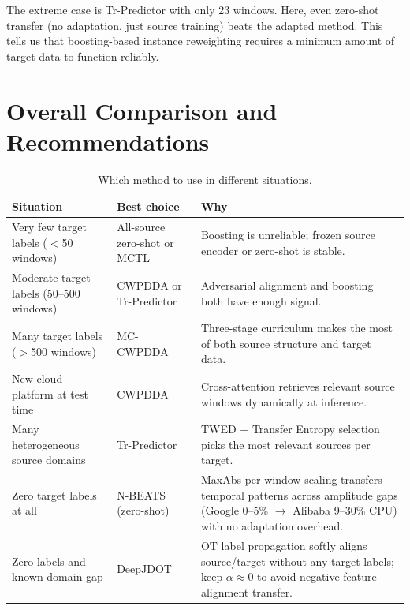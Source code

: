 \documentclass[12pt,a4paper]{article}
\begin{document}
The extreme case is Tr-Predictor with only 23 windows. Here, even zero-shot
transfer (no adaptation, just source training) beats the adapted method.
This tells us that boosting-based instance reweighting requires a minimum
amount of target data to function reliably.

\section{Overall Comparison and Recommendations}
\label{sec:discussion}

\begin{table}[H]
\centering
\small
\caption{Which method to use in different situations.}
\begin{tabular}{@{}p{4.2cm}p{3cm}p{6cm}@{}}
\toprule
\textbf{Situation} & \textbf{Best choice} & \textbf{Why} \\
\midrule
Very few target labels ($<$50 windows) &
  All-source zero-shot or MCTL &
  Boosting is unreliable; frozen source encoder or zero-shot is stable. \\
\addlinespace
Moderate target labels (50--500 windows) &
  CWPDDA or Tr-Predictor &
  Adversarial alignment and boosting both have enough signal. \\
\addlinespace
Many target labels ($>$500 windows) &
  MC-CWPDDA &
  Three-stage curriculum makes the most of both source structure and target data. \\
\addlinespace
New cloud platform at test time &
  CWPDDA &
  Cross-attention retrieves relevant source windows dynamically at inference. \\
\addlinespace
Many heterogeneous source domains &
  Tr-Predictor &
  TWED + Transfer Entropy selection picks the most relevant sources per target. \\
\addlinespace
Zero target labels at all &
  N-BEATS (zero-shot) &
  MaxAbs per-window scaling transfers temporal patterns across amplitude gaps
  (Google 0--5\% $\to$ Alibaba 9--30\% CPU) with no adaptation overhead. \\
\addlinespace
Zero labels and known domain gap &
  DeepJDOT &
  OT label propagation softly aligns source/target without any target labels;
  keep $\alpha \approx 0$ to avoid negative feature-alignment transfer. \\
\bottomrule
\end{tabular}
\end{table}
\end{document}
